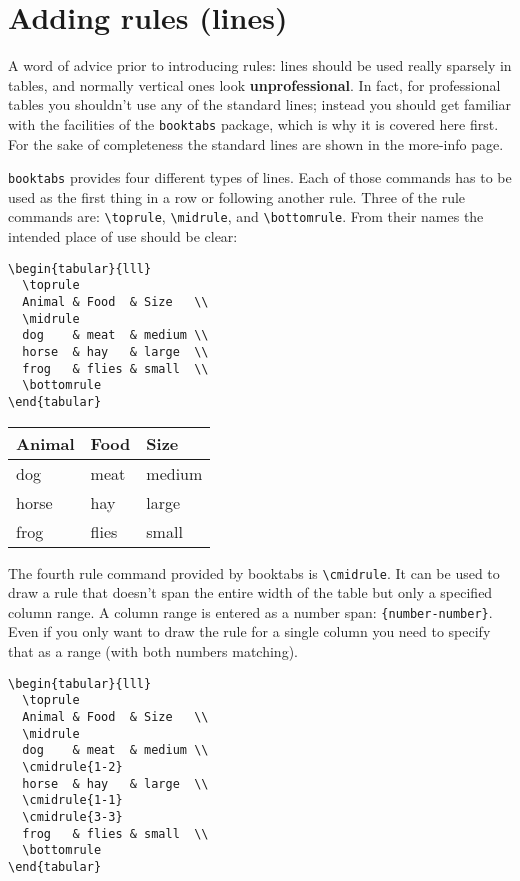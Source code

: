 \documentclass{article}
\begin{document}
\section{Adding rules (lines)}

A word of advice prior to introducing rules: lines should be used really sparsely in tables, and normally vertical ones look \textbf{unprofessional}. In fact, for professional tables you shouldn’t use any of the standard lines; instead you should get familiar with the facilities of the \verb|booktabs| package, which is why it is covered here first. For the sake of completeness the standard lines are shown in the more-info page.

\verb|booktabs| provides four different types of lines. Each of those commands has to be used as the first thing in a row or following another rule. Three of the rule commands are: \verb|\toprule|, \verb|\midrule|, and \verb|\bottomrule|. From their names the intended place of use should be clear:

\begin{verbatim}
\begin{tabular}{lll}
  \toprule
  Animal & Food  & Size   \\
  \midrule
  dog    & meat  & medium \\
  horse  & hay   & large  \\
  frog   & flies & small  \\
  \bottomrule
\end{tabular}
\end{verbatim}

\begin{tabular}{lll}
  \toprule
  Animal & Food  & Size   \\
  \midrule
  dog    & meat  & medium \\
  horse  & hay   & large  \\
  frog   & flies & small  \\
  \bottomrule
\end{tabular}
\vspace{0.5cm}

The fourth rule command provided by booktabs is \verb|\cmidrule|. It can be used to draw a rule that doesn’t span the entire width of the table but only a specified column range. A column range is entered as a number span: \verb|{number-number}|. Even if you only want to draw the rule for a single column you need to specify that as a range (with both numbers matching).

\begin{verbatim}
\begin{tabular}{lll}
  \toprule
  Animal & Food  & Size   \\
  \midrule
  dog    & meat  & medium \\
  \cmidrule{1-2}
  horse  & hay   & large  \\
  \cmidrule{1-1}
  \cmidrule{3-3}
  frog   & flies & small  \\
  \bottomrule
\end{tabular}
\end{verbatim}
\end{document}
